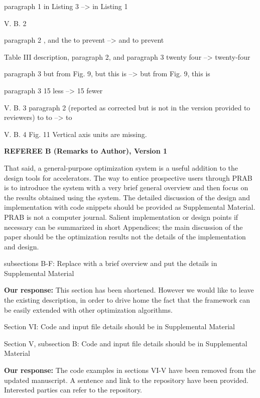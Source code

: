 \documentclass{article}
\begin{document}
paragraph 1
in Listing 3 --> in Listing 1

V. B. 2

paragraph 2
, and the to prevent --> and to prevent

Table III description, paragraph 2, and paragraph 3
twenty four --> twenty-four

paragraph 3
but from Fig. 9, but this is --> but from Fig. 9, this is

paragraph 3
15 less --> 15 fewer

V. B. 3
paragraph 2 (reported as corrected but is not in the version provided
to reviewers)
to to --> to

V. B. 4
Fig. 11 Vertical axis units are missing.




{\bf REFEREE B (Remarks to Author), Version 1}




\vspace{1em}


That said, a general-purpose optimization system is a useful addition
to the design tools for accelerators. The way to entice prospective
users through PRAB is to introduce the system with a very brief
general overview and then focus on the results obtained using the
system. The detailed discussion of the design and implementation with
code snippets should be provided as Supplemental Material. PRAB is not
a computer journal. Salient implementation or design points if
necessary can be summarized in short Appendices; the main discussion
of the paper should be the optimization results not the details of the
implementation and design. 

subsections B-F:
Replace with a brief overview and put the details in Supplemental
Material

{\bf Our response: } {\color{blue} This section has been shortened. However we would like to 
leave the existing description, in order to drive home the fact that the framework can be 
easily extended with other optimization algorithms.}

Section VI: 
Code and input file details should be in Supplemental Material

Section V, subsection B:
Code and input file details should be in Supplemental Material

{\bf Our response:} {\color{blue} The code examples in sections VI-V have been removed from the updated manuscript. 
	A sentence and link to the repository have been provided. Interested parties can refer to the repository.}



 
\end{document}
